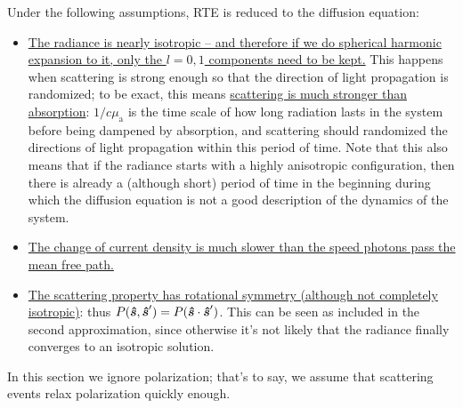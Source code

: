 \documentclass[hyperref, a4paper]{article}
\begin{document}
Under the following assumptions, RTE is reduced to the diffusion equation: 
\begin{itemize}
    \item \ul{The radiance is nearly isotropic 
    -- and therefore if we do spherical harmonic expansion to it, 
    only the $l = 0, 1$ components need to be kept.} 
    This happens when scattering is strong enough 
    so that the direction of light propagation 
    is randomized; 
    to be exact, this means \ul{scattering is much stronger than absorption}:
    $1 / c \mu_{\text{a}}$ is the time scale of 
    how long radiation lasts in the system before being dampened by absorption, 
    and scattering should randomized the directions of light propagation 
    within this period of time. 
    Note that this also means that if the radiance starts with a highly 
    anisotropic configuration, 
    then there is already a (although short) period of time in the beginning 
    during which the diffusion equation is not a good description 
    of the dynamics of the system. 
    \item \ul{The change of current density is much slower 
    than the speed photons pass the mean free path.}
    \item \ul{The scattering property has rotational symmetry (although not completely isotropic)}:
        thus $P(\vu*{s}, \vu*{s}') = P(\vu*{s} \cdot \vu*{s}')$.
        This can be seen as included in the second approximation, 
        since otherwise it's not likely that the radiance finally converges to 
        an isotropic solution.
\end{itemize}

In this section we ignore polarization;
that's to say, we assume that scattering events 
relax polarization quickly enough.
\end{document}
